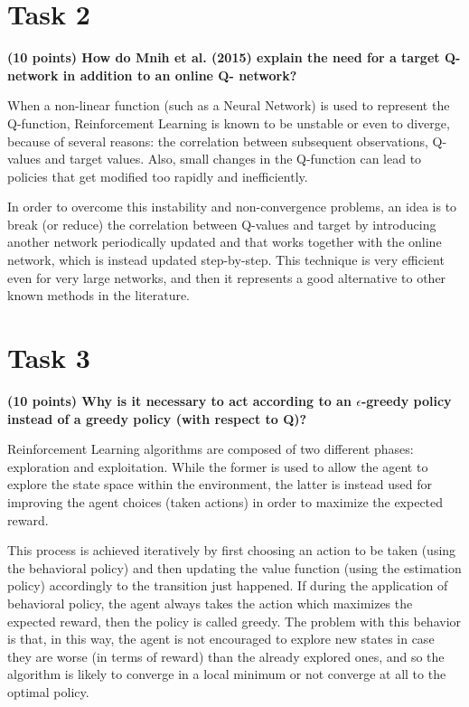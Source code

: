 \documentclass[12pt]{article}
\begin{document}
\section*{Task 2}

\textbf{(10 points) How do Mnih et al. (2015) explain the need for a target Q-network in addition to an online Q- network?}

When a non-linear function (such as a Neural Network) is used to represent the Q-function, Reinforcement Learning is known to be unstable or even to diverge, because of several reasons: the correlation between subsequent observations, Q-values and target values. Also, small changes in the Q-function can lead to policies that get modified too rapidly and inefficiently.

In order to overcome this instability and non-convergence problems, an idea is to break (or reduce) the correlation between Q-values and target by introducing another network  periodically updated and that works together with the online network, which is instead updated step-by-step. This technique is very efficient even for very large networks, and then it represents a good alternative to other known methods in the literature.



\section*{Task 3}

\textbf{(10 points) Why is it necessary to act according to an $\epsilon$-greedy policy instead of a greedy policy (with respect to Q)?}

Reinforcement Learning algorithms are composed of two different phases: exploration and exploitation. While the former is used to allow the agent to explore the state space within the environment, the latter is instead used for improving the agent choices (taken actions) in order to maximize the expected reward.

This process is achieved iteratively by first choosing an action to be taken (using the behavioral policy) and then updating the value function (using the estimation policy) accordingly to the transition just happened. If during the application of behavioral policy, the agent always takes the action which maximizes the expected reward, then the policy is called greedy. The problem with this behavior is that, in this way, the agent is not encouraged to explore new states in case they are worse (in terms of reward) than the already explored ones, and so the algorithm is likely to converge in a local minimum or not converge at all to the optimal policy.
\end{document}

